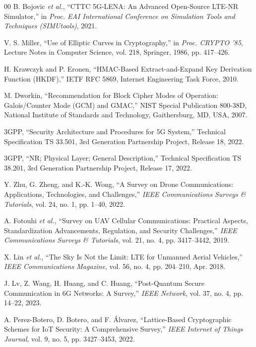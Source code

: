 \documentclass{ieeeaccess}
\begin{document}
\begin{thebibliography}{00}
B. Bojovic \textit{et al.}, ``CTTC 5G-LENA: An Advanced Open-Source LTE-NR Simulator,'' in \textit{Proc. EAI International Conference on Simulation Tools and Techniques (SIMUtools)}, 2021.

V. S. Miller, ``Use of Elliptic Curves in Cryptography,'' in \textit{Proc. CRYPTO '85}, Lecture Notes in Computer Science, vol. 218, Springer, 1986, pp. 417--426.

H. Krawczyk and P. Eronen, ``HMAC-Based Extract-and-Expand Key Derivation Function (HKDF),'' IETF RFC 5869, Internet Engineering Task Force, 2010.

M. Dworkin, ``Recommendation for Block Cipher Modes of Operation: Galois/Counter Mode (GCM) and GMAC,'' NIST Special Publication 800-38D, National Institute of Standards and Technology, Gaithersburg, MD, USA, 2007.

3GPP, ``Security Architecture and Procedures for 5G System,'' Technical Specification TS 33.501, 3rd Generation Partnership Project, Release 18, 2022.

3GPP, ``NR; Physical Layer; General Description,'' Technical Specification TS 38.201, 3rd Generation Partnership Project, Release 17, 2022.

Y. Zhu, G. Zheng, and K.-K. Wong, ``A Survey on Drone Communications: Applications, Technologies, and Challenges,'' \textit{IEEE Communications Surveys \& Tutorials}, vol. 24, no. 1, pp. 1--40, 2022.

A. Fotouhi \textit{et al.}, ``Survey on UAV Cellular Communications: Practical Aspects, Standardization Advancements, Regulation, and Security Challenges,'' \textit{IEEE Communications Surveys \& Tutorials}, vol. 21, no. 4, pp. 3417--3442, 2019.

X. Lin \textit{et al.}, ``The Sky Is Not the Limit: LTE for Unmanned Aerial Vehicles,'' \textit{IEEE Communications Magazine}, vol. 56, no. 4, pp. 204--210, Apr. 2018.

J. Lv, Z. Wang, H. Huang, and C. Huang, ``Post-Quantum Secure Communication in 6G Networks: A Survey,'' \textit{IEEE Network}, vol. 37, no. 4, pp. 14--22, 2023.

A. Perez-Botero, D. Botero, and F. \'{A}lvarez, ``Lattice-Based Cryptographic Schemes for IoT Security: A Comprehensive Survey,'' \textit{IEEE Internet of Things Journal}, vol. 9, no. 5, pp. 3427--3453, 2022.


\end{thebibliography}
\end{document}

